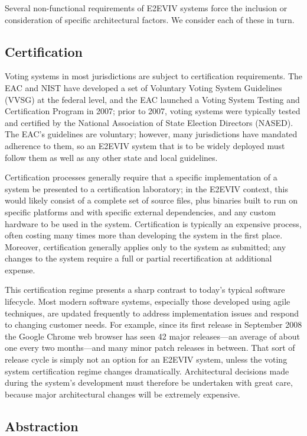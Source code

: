 Several non-functional requirements of E2EVIV systems force the
inclusion or consideration of specific architectural factors. We
consider each of these in turn.

\subsection{Certification}

Voting systems in most jurisdictions are subject to certification
requirements. The EAC and NIST have developed a set of Voluntary
Voting System Guidelines (VVSG) at the federal level, and the EAC
launched a Voting System Testing and Certification Program in 2007;
prior to 2007, voting systems were typically tested and certified by
the National Association of State Election Directors (NASED). The
EAC's guidelines are voluntary; however, many jurisdictions have
mandated adherence to them, so an E2EVIV system that is to be widely
deployed must follow them as well as any other state and local
guidelines.

Certification processes generally require that a specific
implementation of a system be presented to a certification laboratory;
in the E2EVIV context, this would likely consist of a complete set of
source files, plus binaries built to run on specific platforms and
with specific external dependencies, and any custom hardware to be
used in the system. Certification is typically an expensive process,
often costing many times more than developing the system in the first
place. Moreover, certification generally applies only to the system as
submitted; any changes to the system require a full or partial
recertification at additional expense.

This certification regime presents a sharp contrast to today's typical
software lifecycle. Most modern software systems, especially those
developed using agile techniques, are updated frequently to address
implementation issues and respond to changing customer needs. For
example, since its first release in September 2008 the Google Chrome
web browser has seen 42 major releases---an average of about one every
two months---and many minor patch releases in between. That sort of
release cycle is simply not an option for an E2EVIV system, unless the
voting system certification regime changes dramatically.
Architectural decisions made during the system's development must
therefore be undertaken with great care, because major architectural
changes will be extremely expensive.

\subsection{Abstraction}

